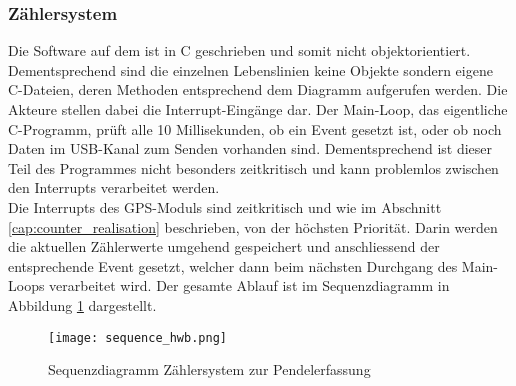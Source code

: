 	\subsubsection{Zählersystem}
	Die Software auf dem \hwb ist in C geschrieben und somit nicht objektorientiert. Dementsprechend sind die einzelnen Lebenslinien keine Objekte sondern eigene C-Dateien, deren Methoden entsprechend dem Diagramm aufgerufen werden. Die Akteure stellen dabei die Interrupt-Eingänge dar.
	\noindent Der Main-Loop, das eigentliche C-Programm, prüft alle 10 Millisekunden, ob ein Event gesetzt ist, oder ob noch Daten im USB-Kanal zum Senden vorhanden sind. Dementsprechend ist dieser Teil des Programmes nicht besonders zeitkritisch und kann problemlos zwischen den Interrupts verarbeitet werden.\\
	Die Interrupts des GPS-Moduls sind zeitkritisch und wie im Abschnitt \ref{cap:counter_realisation} beschrieben, von der höchsten Priorität. Darin werden die aktuellen Zählerwerte umgehend gespeichert und anschliessend der entsprechende Event gesetzt, welcher dann beim nächsten Durchgang des Main-Loops verarbeitet wird.
    Der gesamte Ablauf ist im Sequenzdiagramm in Abbildung \ref{fig:sequence_hwb} dargestellt.
 	\begin{figure}[H]
   		\centering
        \texttt{[image: sequence\_hwb.png]}
        \caption{Sequenzdiagramm Zählersystem zur Pendelerfassung}
        \label{fig:sequence_hwb}
    \end{figure}